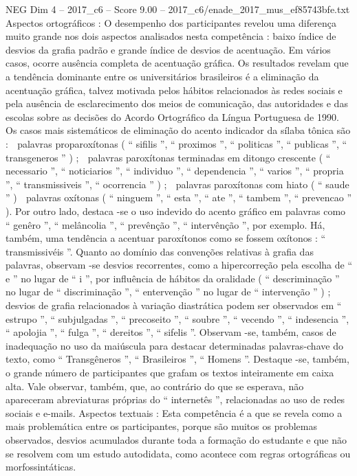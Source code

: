 \begin{textsample}{NEG Dim 4 – 2017\_c6 – Score 9.00 – 2017\_c6/enade\_2017\_mus\_ef85743bfe.txt}
Aspectos ortográficos : O desempenho dos participantes revelou uma diferença muito grande nos dois aspectos analisados nesta competência : baixo índice de desvios da grafia padrão e grande índice de desvios de acentuação.
Em vários casos, ocorre ausência completa de acentuação gráfica.
Os resultados revelam que a tendência dominante entre os universitários brasileiros é a eliminação da acentuação gráfica, talvez motivada pelos hábitos relacionados às redes sociais e pela ausência de esclarecimento dos meios de comunicação, das autoridades e das escolas sobre as decisões do Acordo Ortográfico da Língua Portuguesa de 1990.
Os casos mais sistemáticos de eliminação do acento indicador da sílaba tônica são :  palavras proparoxítonas ( “ sifilis ”, “ proximos ”, “ politicas ”, “ publicas ”, “ transgeneros ” ) ;  palavras paroxítonas terminadas em ditongo crescente ( “ necessario ”, “ noticiarios ”, “ individuo ”, “ dependencia ”, “ varios ”, “ propria ”, “ transmissiveis ”, “ ocorrencia ” ) ;  palavras paroxítonas com hiato ( “ saude ” )  palavras oxítonas ( “ ninguem ”, “ esta ”, “ ate ”, “ tambem ”, “ prevencao ” ).
Por outro lado, destaca -se o uso indevido do acento gráfico em palavras como “ genêro ”, “ melâncolia ”, “ prevênção ”, “ intervênção ”, por exemplo.
Há, também, uma tendência a acentuar paroxítonos como se fossem oxítonos : “ transmissivéis ”.
Quanto ao domínio das convenções relativas à grafia das palavras, observam -se desvios recorrentes, como a hipercorreção pela escolha de “ e ” no lugar de “ i ”, por influência de hábitos da oralidade ( “ descriminação ” no lugar de “ discriminação ”, “ entervenção ” no lugar de “ intervenção ” ) ; desvios de grafia relacionados à variação diastrática podem ser observados em “ estrupo ”, “ subjulgadas ”, “ precoseito ”, “ soubre ”, “ vecendo ”, “ indesencia ”, “ apolojia ”, “ fulga ”, “ dereitos ”, “ sifelis ”.
Observam -se, também, casos de inadequação no uso da maiúscula para destacar determinadas palavras-chave do texto, como “ Transgêneros ”, “ Brasileiros ”, “ Homens ”.
Destaque -se, também, o grande número de participantes que grafam os textos inteiramente em caixa alta.
Vale observar, também, que, ao contrário do que se esperava, não apareceram abreviaturas próprias do “ internetês ”, relacionadas ao uso de redes sociais e e-mails.
Aspectos textuais : Esta competência é a que se revela como a mais problemática entre os participantes, porque são muitos os problemas observados, desvios acumulados durante toda a formação do estudante e que não se resolvem com um estudo autodidata, como acontece com regras ortográficas ou morfossintáticas.

\end{textsample}
